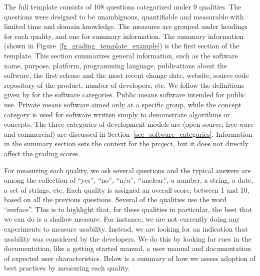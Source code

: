 \documentclass[final, 3p, times, authoryear]{elsarticle}
\begin{document}
The full template consists of 108 questions categorized under 9 qualities.  The
questions were designed to be unambiguous, quantifiable and measurable with
limited time and domain knowledge. The measures are grouped under headings for
each quality, and one for summary information. The summary information (shown in
Figure~\ref{fg_grading_template_example}) is the first section of the template.
This section summarizes general information, such as the software name, purpose,
platform, programming language, publications about the software, the first
release and the most recent change date, website, source code repository of the
product, number of developers, etc.  We follow the definitions given by
\citet{GewaltigAndCannon2012} for the software categories.  Public means
software intended for public use.  Private means software aimed only at a
specific group, while the concept category is used for software written simply
to demonstrate algorithms or concepts. The three categories of development
models are (open source, free-ware and commercial) are discussed in
Section~\ref{sec_software_categories}.  Information in the summary section sets
the context for the project, but it does not directly affect the grading scores.

For measuring each quality, we ask several questions and the typical answers are
among the collection of ``yes'', ``no'', ``n/a'', ``unclear'', a number, a
string, a date, a set of strings, etc. Each quality is assigned an overall
score, between 1 and 10, based on all the previous questions.  Several of the
qualities use the word ``surface''.  This is to highlight that, for these
qualities in particular, the best that we can do is a shallow measure.  For
instance, we are not currently doing any experiments to measure usability.
Instead, we are looking for an indication that usability was considered by the
developers.  We do this by looking for cues in the documentation, like a getting
started manual, a user manual and documentation of expected user
characteristics.  Below is a summary of how we assess adoption of best practices
by measuring each quality.
\end{document}
